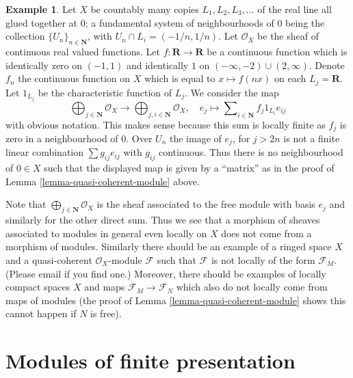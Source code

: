 \documentclass{stacks-project}
\theoremstyle{plain}
\theoremstyle{definition}
\newtheorem{example}[subsection]{Example}
\theoremstyle{remark}
\numberwithin{equation}{subsection}
\begin{document}
\begin{example}
\label{example-quasi-coherent}
Let $X$ be countably many copies $L_1, L_2, L_3, \ldots$
of the real line all glued together at $0$; a fundamental
system of neighbourhoods of $0$ being the collection
$\{U_n\}_{n \in \mathbf{N}}$, with $U_n \cap L_i = (-1/n, 1/n)$.
Let $\mathcal{O}_X$ be the sheaf of continuous real valued functions.
Let $f : \mathbf{R} \to \mathbf{R}$ be a continuous function
which is identically zero on $(-1, 1)$ and identically $1$
on $(-\infty, -2) \cup (2, \infty)$. Denote $f_n$ the continuous
function on $X$ which is equal to $x \mapsto f(nx)$ on each
$L_j = \mathbf{R}$. Let $1_{L_j}$ be the characteristic function
of $L_j$. We consider the map
$$
\bigoplus\nolimits_{j \in \mathbf{N}}
\mathcal{O}_X
\longrightarrow
\bigoplus\nolimits_{j, i \in \mathbf{N}}
\mathcal{O}_X, \quad
e_j \longmapsto \sum\nolimits_{i \in \mathbf{N}} f_j 1_{L_i} e_{ij}
$$
with obvious notation. This makes sense because this sum is locally
finite as $f_j$ is zero in a neighbourhood of $0$. Over $U_n$
the image of $e_j$, for $j > 2n$ is not a finite linear combination
$\sum g_{ij} e_{ij}$ with $g_{ij}$ continuous. Thus there is
no neighbourhood of $0 \in X$ such that the displayed map is given by
a ``matrix'' as in the proof of Lemma \ref{lemma-quasi-coherent-module} above.

\medskip\noindent
Note that $\bigoplus\nolimits_{j \in \mathbf{N}} \mathcal{O}_X$
is the sheaf associated to the free module with basis $e_j$
and similarly for the other direct sum. Thus we see that a
morphism of sheaves associated to modules in general even
locally on $X$ does not come from a morphism of modules.
Similarly there should be an example of a ringed space $X$
and a quasi-coherent $\mathcal{O}_X$-module $\mathcal{F}$
such that $\mathcal{F}$ is not locally of the form $\mathcal{F}_M$.
(Please email if you find one.)
Moreover, there should be examples of locally compact spaces
$X$ and maps $\mathcal{F}_M \to \mathcal{F}_N$ which also do
not locally come from maps of modules (the proof of Lemma
\ref{lemma-quasi-coherent-module} shows this cannot happen
if $N$ is free).
\end{example}












\section{Modules of finite presentation}
\label{section-finite-presentation}
\end{document}
